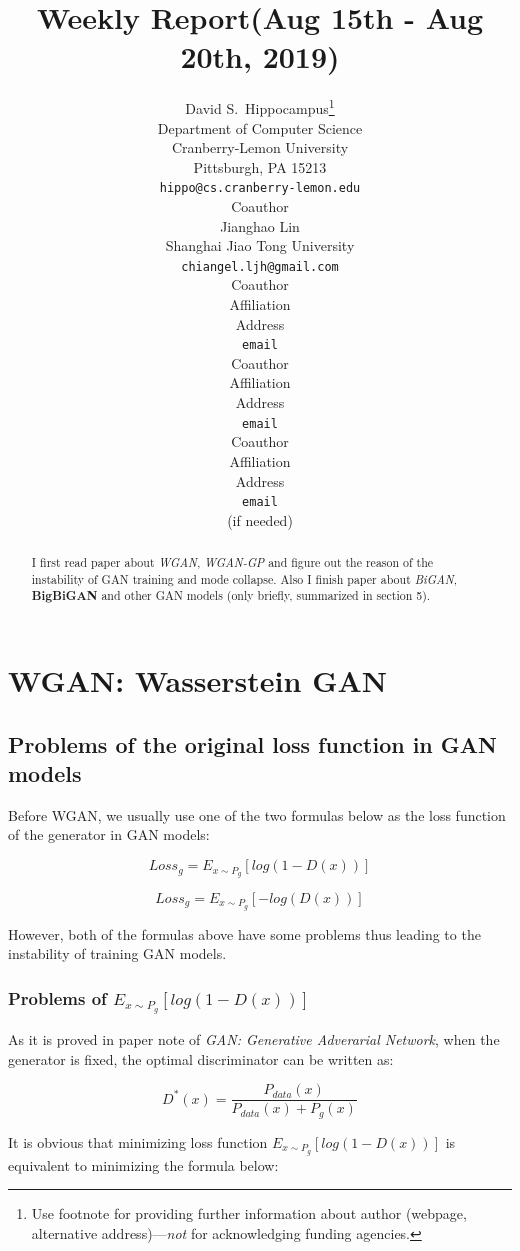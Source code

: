 \documentclass{article} %
\title{Weekly Report(Aug 15th - Aug 20th, 2019)
}
\author{
David S.~Hippocampus\thanks{ Use footnote for providing further information
about author (webpage, alternative address)---\emph{not} for acknowledging
funding agencies.} \\
Department of Computer Science\\
Cranberry-Lemon University\\
Pittsburgh, PA 15213 \\
\texttt{hippo@cs.cranberry-lemon.edu} \\
\And
Coauthor \\
Jianghao Lin \\
Shanghai Jiao Tong University \\
\texttt{chiangel.ljh@gmail.com} \\
\AND
Coauthor \\
Affiliation \\
Address \\
\texttt{email} \\
\And
Coauthor \\
Affiliation \\
Address \\
\texttt{email} \\
\And
Coauthor \\
Affiliation \\
Address \\
\texttt{email} \\
(if needed)\\
}
\begin{document}
\maketitle

\begin{abstract}

I first read paper about \emph{WGAN}, \emph{WGAN-GP} and figure out the reason of the instability of GAN training and mode collapse. Also I finish paper about \emph{BiGAN}, \textbf{BigBiGAN} and other GAN models (only briefly, summarized in section 5).

\end{abstract}

\section{WGAN: Wasserstein GAN}

\subsection{Problems of the original loss function in GAN models}

Before WGAN, we usually use one of the two formulas below as the loss function of the generator in GAN models:

\begin{equation}
    Loss_g = E_{x \sim P_g}[log(1-D(x))]
\end{equation}

\begin{equation}
    Loss_g = E_{x \sim P_g}[-log(D(x))]
\end{equation}

However, both of the formulas above have some problems thus leading to the instability of training GAN models.

\subsubsection{Problems of $E_{x \sim P_g}[log(1-D(x))]$}

As it is proved in paper note of \emph{GAN: Generative Adverarial Network}, when the generator is fixed, the optimal discriminator can be written as:

\begin{equation}
    D^{*}(x)=\frac{P_{data}(x)}{P_{data}(x)+P_g(x)}
\end{equation}

It is obvious that minimizing loss function $E_{x \sim P_g}[log(1-D(x))]$ is equivalent to minimizing the formula below:
\end{document}

